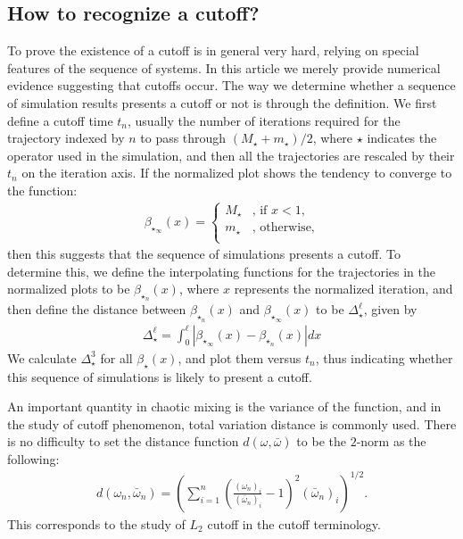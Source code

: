 \documentclass[twocolumn,10pt]{asme2e}
\begin{document}
\subsection*{How to recognize a cutoff?}
To prove the existence of a cutoff is in general very hard, relying on
special features of the sequence of systems. In this article we merely
provide numerical evidence suggesting that cutoffs occur. The way we
determine whether a sequence of simulation results presents a cutoff
or not is through the definition. We first define a cutoff time $t_n$,
usually the number of iterations required for the trajectory indexed
by $n$ to pass through $(M_{\star}+m_{\star})/2$, where $\star$
indicates the operator used in the simulation, and then all the
trajectories are rescaled by their $t_n$ on the iteration axis. If the
normalized plot shows the tendency to converge to the function:
\begin{eqnarray}
   \label{limittraj}
   \beta_{\star_\infty}(x) = \begin{cases}
                     M_{\star} &\text{, if } x<1, \\
                     m_{\star} &\text{, otherwise}, \\
                     \end{cases} 
\end{eqnarray}
then this suggests that the sequence of simulations presents a
cutoff. To determine this, we define the interpolating functions for
the trajectories in the normalized plots to be $\beta_{\star_n}(x)$,
where $x$ represents the normalized iteration, and then define the
distance between $\beta_{\star_n}(x)$ and $\beta_{\star_\infty}(x)$ to
be $\Delta^\ell_{\star}$, given by
\begin{eqnarray}
    \label{trajdistance}
    \Delta_{\star}^\ell= \int_0^\ell | \beta_{{\star}_\infty}(x)-\beta_{{\star}_n}(x)|dx
\end{eqnarray}
We calculate $\Delta^3_{\star}$ for all $\beta_{\star}(x)$, and plot
them versus $t_n$, thus indicating whether this sequence of
simulations is likely to present a cutoff.

An important quantity in chaotic mixing is the variance of the
function, and in the study of cutoff phenomenon, total variation
distance is commonly used. There is no difficulty to set the distance
function $d(\omega,\bar{\omega})$ to be the $2$-norm as the following:
  \begin{eqnarray}
  \label{l2distance}
    d(\omega_n,\bar{\omega}_n) = \left(\sum_{i=1}^{n} \left( \frac{(\omega_n)_i}{(\bar{\omega}_n)_i}-1 \right)^2(\bar{\omega}_n)_i \right)^{1/2}.
  \end{eqnarray}
This corresponds to the study of $L_2$ cutoff in the cutoff terminology. 
\end{document}
